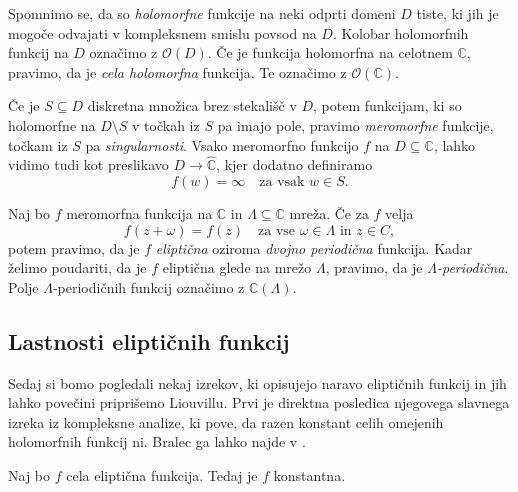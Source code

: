 \documentclass[mat1]{fmfdelo}
\newcommand{\C}{\mathbb C}
\newcommand{\RS}{\widehat{\C}}
\newcommand{\om}{\omega}
\newcommand{\hol}[1]{\mathcal{O}(#1)}
\theoremstyle{definition}
\begin{document}
Spomnimo se, da so \emph{holomorfne} funkcije na neki odprti domeni $D$ tiste, ki jih je mogoče odvajati v kompleksnem smislu povsod na $D$. Kolobar holomorfnih funkcij na $D$ označimo z $\hol{D}$. Če je funkcija holomorfna na celotnem $\C$, pravimo, da je \emph{cela holomorfna} funkcija. Te označimo z $\hol{\C}$.

Če je $S \subseteq D$ diskretna množica brez stekališč v $D$, potem funkcijam, ki so holomorfne na $D \setminus S$ v točkah iz $S$ pa imajo pole, pravimo \emph{meromorfne} funkcije, točkam iz $S$ pa \emph{singularnosti}. Vsako meromorfno funkcijo $f$ na $D \subseteq \C$, lahko vidimo tudi kot preslikavo $D \to \RS$, kjer dodatno definiramo 
\[
    f(w) = \infty \quad \text{za vsak $w \in S$.} 
\]

\begin{definicija}
    Naj bo $f$ meromorfna funkcija na $\C$ in $\Lambda \subseteq \C$ mreža. Če za $f$ velja
    \[
        f(z + \om) = f(z) \quad \text{za vse $\om \in \Lambda$ in $z \in C$},
    \]
    potem pravimo, da je $f$ \emph{eliptična} oziroma \emph{dvojno periodična} funkcija. Kadar želimo poudariti, da je $f$ eliptična glede na mrežo $\Lambda$, pravimo, da je \emph{$\Lambda$-periodična}. Polje $\Lambda$-periodičnih funkcij označimo z $\C(\Lambda)$. %
\end{definicija}





\subsection{Lastnosti eliptičnih funkcij}

Sedaj si bomo pogledali nekaj izrekov, ki opisujejo naravo eliptičnih funkcij in jih lahko povečini priprišemo Liouvillu. Prvi je direktna posledica njegovega slavnega izreka iz kompleksne analize, ki pove, da razen konstant celih omejenih holomorfnih funkcij ni. Bralec ga lahko najde v \cite[]{}.

\begin{izrek}
    \label{cele el. funkcije}
    Naj bo $f$ cela eliptična funkcija. Tedaj je $f$ konstantna.
\end{izrek}
\end{document}
